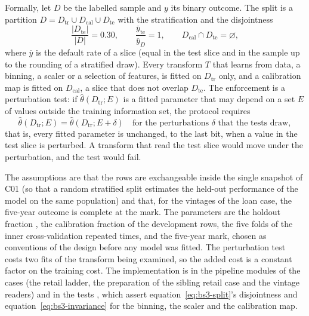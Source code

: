 Formally, let $D$ be the labelled sample and $y$ its binary outcome. The split is a partition $D=D_{\mathrm{tr}}\cup D_{\mathrm{cal}}\cup D_{\mathrm{te}}$ with
the stratification and the disjointness
\begin{equation}
\frac{|D_{\mathrm{te}}|}{|D|}=0.30,\qquad \frac{\overline{y}_{\mathrm{te}}}{\overline{y}_{D}}=1,\qquad D_{\mathrm{cal}}\cap D_{\mathrm{te}}=\varnothing,
\label{eq:bs3-split}
\end{equation}
where $\overline{y}$ is the default rate of a slice (equal in the test slice and in the sample up to the rounding of a stratified draw). Every transform
$T$ that learns from data, a binning, a scaler or a selection of features, is fitted on $D_{\mathrm{tr}}$ only, and a calibration map is fitted on $D_{\mathrm{cal}}$,
a slice that does not overlap $D_{\mathrm{te}}$. The enforcement is a perturbation test: if $\hat\theta(D_{\mathrm{tr}};E)$ is a fitted parameter that may depend on a
set $E$ of values outside the training information set, the protocol requires
\begin{equation}
\hat\theta(D_{\mathrm{tr}};E)=\hat\theta(D_{\mathrm{tr}};E+\delta)\quad\text{for the perturbations }\delta\text{ that the tests draw},
\label{eq:bs3-invariance}
\end{equation}
that is, every fitted parameter is unchanged, to the last bit, when a value in the test slice is perturbed. A transform that read the test slice would move
under the perturbation, and the test would fail.

The assumptions are that the rows are exchangeable inside the single snapshot of C01 (so that a random stratified split estimates the held-out
performance of the model on the same population) and that, for the vintages of the loan case, the five-year outcome is complete at the mark. The
parameters are the holdout fraction \pxThreeHoldout{}, the calibration fraction \pxThreeCalibration{} of the development rows, the five folds of the inner cross-validation repeated \pxThreeRepeats{} times, and the five-year mark, chosen as conventions of the design
before any model was fitted. The perturbation test costs two fits of the transform being examined, so the added cost is a constant factor on
the training cost. The implementation is in the pipeline modules of the cases (the retail ladder, the preparation of the sibling retail case
and the vintage readers) and in the tests , which assert equation~\eqref{eq:bs3-split}'s disjointness and
equation~\eqref{eq:bs3-invariance} for the binning, the scaler and the calibration map.

